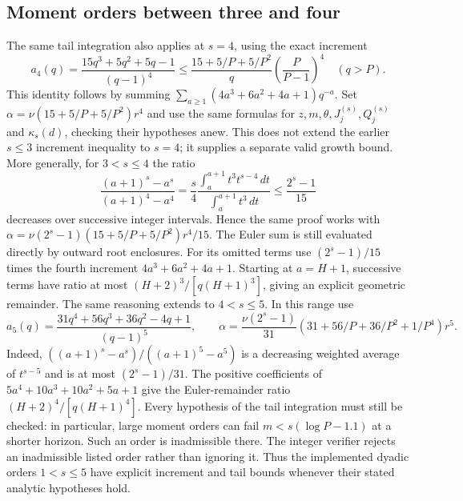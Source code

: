 \documentclass[11pt]{article}
\begin{document}
\subsection{Moment orders between three and four}
The same tail integration also applies at $s=4$, using the exact increment
\[
 a_4(q)=\frac{15q^3+5q^2+5q-1}{(q-1)^4}
 \leq\frac{15+5/P+5/P^2}{q}\left(\frac P{P-1}\right)^4
 \quad(q>P).
\]
This identity follows by summing
$\sum_{a\geq1}(4a^3+6a^2+4a+1)q^{-a}$.
Set $\alpha=\nu(15+5/P+5/P^2)r^4$ and use the same formulas for
$z,m,\theta,J_j^{(s)},Q_j^{(s)}$ and $\kappa_s(d)$, checking their
hypotheses anew. This does not extend the earlier $s\leq3$ increment
inequality to $s=4$; it supplies a separate valid growth bound.
More generally, for $3<s\leq4$ the ratio
\[
 \frac{(a+1)^s-a^s}{(a+1)^4-a^4}
 =\frac{s}{4}\frac{\int_a^{a+1}t^3t^{s-4}\,dt}
                         {\int_a^{a+1}t^3\,dt}
 \leq\frac{2^s-1}{15}
\]
decreases over successive integer intervals. Hence the same proof works
with $\alpha=\nu(2^s-1)(15+5/P+5/P^2)r^4/15$.
The Euler sum is still evaluated directly by outward root enclosures.
For its omitted terms use $(2^s-1)/15$ times the fourth increment
$4a^3+6a^2+4a+1$. Starting at $a=H+1$, successive terms have ratio at
most $(H+2)^3/[q(H+1)^3]$, giving an explicit geometric remainder.
The same reasoning extends to $4<s\leq5$. In this range use
\[
 a_5(q)=\frac{31q^4+56q^3+36q^2-4q+1}{(q-1)^5},\qquad
 \alpha=\frac{\nu(2^s-1)}{31}
       (31+56/P+36/P^2+1/P^4)r^5.
\]
Indeed, $((a+1)^s-a^s)/((a+1)^5-a^5)$ is a decreasing
weighted average of $t^{s-5}$ and is at most $(2^s-1)/31$.
The positive coefficients of $5a^4+10a^3+10a^2+5a+1$ give the
Euler-remainder ratio $(H+2)^4/[q(H+1)^4]$.
Every hypothesis of the tail integration must still be checked:
in particular, large moment orders can fail $m<s(\log P-1.1)$ at a
shorter horizon. Such an order is inadmissible there. The integer
verifier rejects an inadmissible listed order rather than ignoring it.
Thus the implemented dyadic orders $1<s\leq5$ have explicit increment
and tail bounds whenever their stated analytic hypotheses hold.
\end{document}
